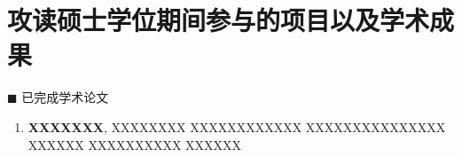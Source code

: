 \chapter*{\large 攻读硕士学位期间参与的项目以及学术成果}
\vskip 2mm
\vspace{-1cm}
\renewcommand{\labelenumi}{[\arabic{enumi}]}


{\heiti $\blacksquare$ 已完成学术论文}\vskip 3mm
\begin{enumerate}
	\item \textbf{XXXXXXX}, XXXXXXXX XXXXXXXXXXXX XXXXXXXXXXXXXXX XXXXXX XXXXXXXXXX XXXXXX
	
\end{enumerate} 

